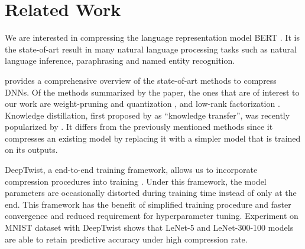 \documentclass[10pt]{article}
\begin{document}

\section{Related Work}


We are interested in compressing the language representation model BERT
\citep{devlin2018bert}.  It is the state-of-art result in many natural
language processing tasks  such as natural language inference, paraphrasing
and named entity recognition.

\citet{cheng2017survey} provides a comprehensive overview of the state-of-art
methods to compress DNNs. Of the methods summarized by the paper, the ones
that are of interest to our work are weight-pruning and quantization
\citep{han2015deep}, and low-rank factorization \citep{denton2014exploiting}.
Knowledge distillation, first proposed by \citep{bucilua2006model} as
``knowledge transfer'', was recently popularized by
\citep{hinton2015distilling}. It differs from the previously mentioned methods
since it compresses an existing model by replacing it with a simpler model
that is trained on its outputs.

DeepTwist, a end-to-end training framework, allows us to incorporate
compression procedures into training \citep{lee2018deeptwist}. Under this
framework, the model parameters are occasionally distorted during training
time instead of only at the end. This framework has the benefit of simplified
training procedure and faster convergence and reduced requirement for
hyperparameter tuning. Experiment on MNIST dataset with DeepTwist shows that
LeNet-5 and LeNet-300-100 models are able to retain predictive accuracy under
high compression rate.
\end{document}
